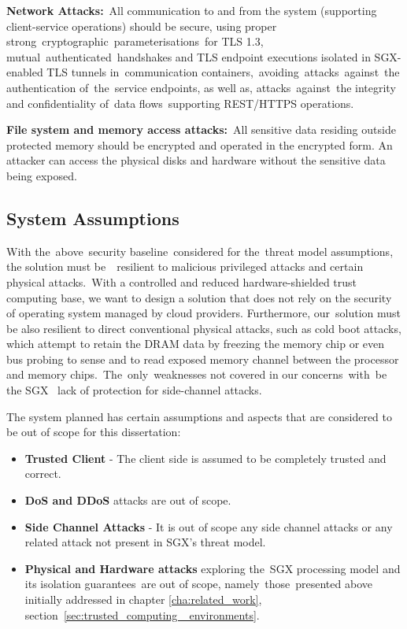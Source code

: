 \textbf{Network Attacks:} All communication to and from the system (supporting client-service operations) should be secure, using proper strong cryptographic parameterisations for TLS 1.3, mutual authenticated handshakes and TLS endpoint executions isolated in SGX-enabled TLS tunnels in communication containers, avoiding attacks against the authentication of the service endpoints, as well as, attacks against the integrity and confidentiality of data flows supporting \gls{REST}/\gls{HTTPS} operations.

\textbf{File system and memory access attacks:} All sensitive data residing outside protected memory should be encrypted and operated in the encrypted form. An attacker can access the physical disks and hardware without the sensitive data being exposed.
	
\subsection{System Assumptions}
\label{ssec:other_system_assumptions}

With the above security baseline considered for the threat model assumptions, the solution must be  resilient to malicious privileged attacks and certain physical attacks. With a controlled and reduced hardware-shielded trust computing base, we want to design a solution that does not rely on the security of operating system managed by cloud providers. Furthermore, our solution must be also resilient to direct conventional physical attacks, such as cold boot attacks, which attempt to retain the DRAM data by freezing the memory chip or even bus probing to sense and to read exposed memory channel between the processor and memory chips. The only weaknesses not covered in our concerns with be the SGX  lack of protection for side-channel attacks.

The system planned has certain assumptions and aspects that are considered to be out of scope for this dissertation:

\begin{itemize}
	\item \textbf{Trusted Client} - The client side is assumed to be completely trusted and correct.
	\item \textbf{\gls{DoS} and \gls{DDoS}} attacks are out of scope.
	\item \textbf{Side Channel Attacks} - It is out of scope any side channel attacks or any related attack not present in \gls{SGX}'s threat model.
	\item \textbf{Physical and Hardware attacks} exploring the \gls{SGX} processing model and its isolation guarantees are out of scope, namely those presented above initially addressed in chapter \ref{cha:related_work}, section \ref{sec:trusted_computing _environments}.
\end{itemize}

